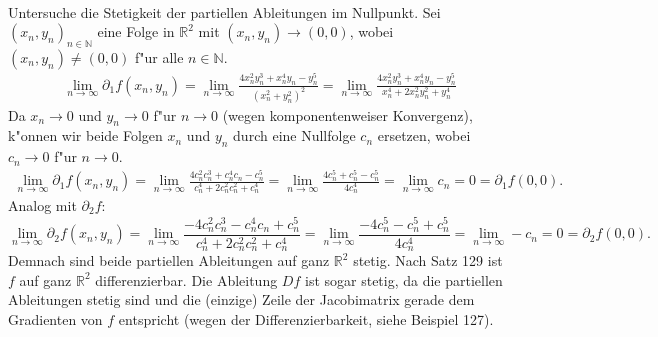\documentclass[a4paper, landscape,twocolumn,fontsize=8pt]{scrartcl}
\theoremstyle{plain}
\begin{document}
\begin{enumerate}[label=(\roman*)]
\begin{align*}
    \end{align*}
    Untersuche die Stetigkeit der partiellen Ableitungen im Nullpunkt. Sei $(x_n,y_n)_{n \in \mathbb N}$ eine Folge in $\mathbb R^2$ mit $(x_n,y_n) \to (0,0)$, wobei $(x_n,y_n) \neq (0,0)$ f"ur alle $n \in \mathbb N$.
    \begin{align*}
        \lim_{n \to \infty} \partial_1f(x_n,y_n) = \lim_{n \to \infty} \frac{4x_n^2y_n^3+x_n^4y_n-y_n^5}{(x_n^2+y_n^2)^2} = \lim_{n \to \infty} \frac{4x_n^2y_n^3+x_n^4y_n-y_n^5}{x_n^4+2x_n^2y_n^2+y_n^4}
    \end{align*}
    Da $x_n \to 0$ und $y_n \to 0$ f"ur $n \to 0$ (wegen komponentenweiser Konvergenz), k"onnen wir beide Folgen $x_n$ und $y_n$ durch eine Nullfolge $c_n$ ersetzen, wobei $c_n \to 0$ f"ur $n \to 0$.
    \begin{align*}
        \lim_{n \to \infty} \partial_1f(x_n,y_n) = \lim_{n \to \infty} \frac{4c_n^2c_n^3+c_n^4c_n-c_n^5}{c_n^4+2c_n^2c_n^2+c_n^4} = \lim_{n \to \infty} \frac{4c_n^5+c_n^5-c_n^5}{4c_n^4} = \lim_{n \to \infty} c_n = 0 = \partial_1f(0,0).
    \end{align*}
    Analog mit $\partial_2f$:
    \[
        \lim_{n \to \infty} \partial_2f(x_n,y_n) = \lim_{n \to \infty} \frac{-4c_n^2c_n^3-c_n^4c_n+c_n^5}{c_n^4+2c_n^2c_n^2+c_n^4} = \lim_{n \to \infty} \frac{-4c_n^5-c_n^5+c_n^5}{4c_n^4} = \lim_{n \to \infty} -c_n = 0 = \partial_2f(0,0).
    \]
    Demnach sind beide partiellen Ableitungen auf ganz $\mathbb R^2$ stetig. Nach Satz 129 ist $f$ auf ganz $\mathbb R^2$ differenzierbar. Die Ableitung $Df$ ist sogar stetig, da die partiellen Ableitungen stetig sind und die (einzige) Zeile der Jacobimatrix gerade dem Gradienten von $f$ entspricht (wegen der Differenzierbarkeit, siehe Beispiel 127). 
    

\end{enumerate}
\end{document}
